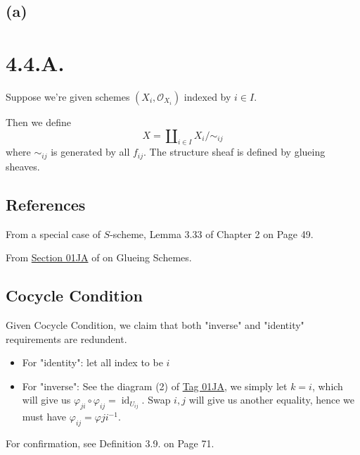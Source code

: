 \subsection{(a)}



\section{4.4.A.}\label{4.4.A.}

Suppose we're given schemes $(X_i,\mathcal O_{X_i})$ indexed by $i\in I$.

Then we define 
\[X=\amalg_{i\in I}X_i/\sim_{ij}\]where $\sim_{ij}$ is generated by all $f_{ij}$. The structure sheaf is defined by glueing sheaves. 

\subsection{References}

From a special case of $S$-scheme, \cite{qing2006algebraic} Lemma 3.33 of Chapter 2 on Page 49.

From \href{https://stacks.math.columbia.edu/tag/01JA}{Section 01JA} of \cite{stacks-project} on Glueing Schemes.

\subsection{Cocycle Condition}
Given Cocycle Condition, we claim that both "inverse" and "identity" requirements are redundent. 
\begin{itemize}

\item For "identity": let all index to be $i$
\item For "inverse": See the diagram (2) of \href{https://stacks.math.columbia.edu/tag/01JA}{Tag 01JA}, we simply let $k=i$, which will give us $\varphi_{ji}\circ\varphi_{ij}=\operatorname{id}_{U_{ij}}$. Swap $i,j$ will give us another equality, hence we must have $\varphi_{ij}=\varphi{ji}^{-1}$.
\end{itemize}

For confirmation, see \cite{gortz2020algebraic} Definition 3.9. on Page 71.